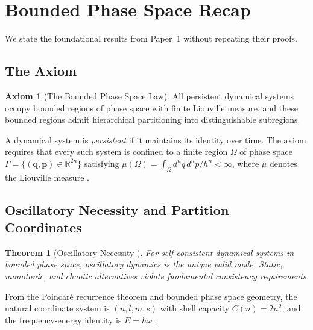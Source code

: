 \documentclass[11pt,a4paper]{article}
\newtheorem{theorem}{Theorem}[section]
\theoremstyle{definition}
\newtheorem{axiom}{Axiom}
\theoremstyle{remark}
\newcommand{\Real}{\mathbb{R}}
\begin{document}
\section{Bounded Phase Space Recap}
\label{sec:bps_recap}

We state the foundational results from Paper~1 \citep{sachikonye2025a} without repeating their proofs.

\subsection{The Axiom}

\begin{axiom}[The Bounded Phase Space Law]
\label{ax:bpsl_recap}
All persistent dynamical systems occupy bounded regions of phase space with finite Liouville measure, and these bounded regions admit hierarchical partitioning into distinguishable subregions.
\end{axiom}

A dynamical system is \emph{persistent} if it maintains its identity over time. The axiom requires that every such system is confined to a finite region $\Omega$ of phase space $\Gamma = \{(\mathbf{q}, \mathbf{p}) \in \Real^{2n}\}$ satisfying $\mu(\Omega) = \int_\Omega d^n q \, d^n p / h^n < \infty$, where $\mu$ denotes the Liouville measure \citep{planck1901, landau1976}.

\subsection{Oscillatory Necessity and Partition Coordinates}

\begin{theorem}[Oscillatory Necessity {\citep[Theorem~2.4]{sachikonye2025a}}]
\label{thm:oscillatory_recap}
For self-consistent dynamical systems in bounded phase space, oscillatory dynamics is the unique valid mode. Static, monotonic, and chaotic alternatives violate fundamental consistency requirements.
\end{theorem}

From the Poincar\'{e} recurrence theorem \citep{poincare1890} and bounded phase space geometry, the natural coordinate system is $(n, l, m, s)$ with shell capacity $C(n) = 2n^2$, and the frequency-energy identity is $E = \hbar\omega$ \citep{bohr1913, sachikonye2025a}.
\end{document}
